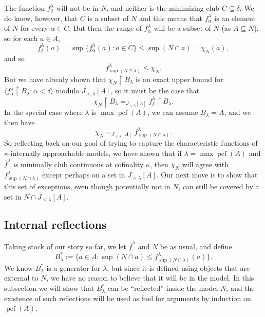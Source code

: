 \documentclass[10pt]{amsart}
\theoremstyle{plain}
\theoremstyle{definition}
\theoremstyle{remark}
\DeclareMathOperator{\pcf}{pcf}
\numberwithin{equation}{section}
\begin{document}
The function $f^\lambda_\delta$ will not be in $N$, and neither is the minimizing club $C\subseteq\delta$.  We do know, however, that $C$ is a
subset of $N$ and this means that $f^\lambda_\alpha$ is an element of $N$ for every $\alpha\in C$. But then the range of $f^\lambda_\alpha$
will be a subset of $N$ (as $A\subseteq N$), so for each $a\in A$,
\begin{equation}
f^\lambda_\delta(a) = \sup\{f^\lambda_\alpha(a):a\in C\}\leq\sup(N\cap a) = \chi_N(a),
\end{equation}
and so
\begin{equation}
\label{eqn:65.8}
f^\lambda_{\sup(N\cap\lambda)}\leq \chi_N.
\end{equation}
But we have already shown that $\chi_N\restriction B_\lambda$ is an exact upper bound for
 $\langle f_\alpha^\lambda\restriction B_\lambda:\alpha<\delta\rangle$ modulo $J_{<\lambda}[A]$, so it must be the case that
 \begin{equation}
 \chi_N\restriction B_\lambda =_{J_{<\lambda}[A]} f^\lambda_\delta\restriction B_\lambda.
 \end{equation}
In the special case where $\lambda$ is $\max\pcf(A)$, we can assume $B_\lambda = A$, and we then have
\begin{equation}
\chi_N =_{J_{<\lambda}[A]}f^\lambda_{\sup(N\cap\lambda)}.
\end{equation}
So reflecting back on our goal of trying to capture the characteristic functions of $\kappa$-internally approachable models, we have
shown that if $\lambda = \max\pcf(A)$ and $\bar{f}^\lambda$ is minimally club continuous at cofinality $\kappa$, then $\chi_N$ will agree
with $f^\lambda_{\sup(N\cap\lambda)}$ except perhaps on a set in $J_{<\lambda}[A]$.   Our next move is to show that this set of exceptions,
even though potentially not in $N$, can still be covered by a set in $N\cap J_{<\lambda}[A]$.


\subsection{Internal reflections}

Taking stock of our story so far, we let $\bar{f}^\lambda$ and $N$ be as usual, and define
\begin{equation}
B^*_\lambda:=\{a\in A:  \sup(N\cap a)\leq f^\lambda_{\sup(N\cap\lambda)}(a)\}.
\end{equation}
We know $B^*_\lambda$ is a generator for $\lambda$, but since it is defined using objects that are external to $N$, we have no reason
to believe that it will be in the model.  In this subsection we will show that $B^*_\lambda$ can be ``reflected'' inside the model $N$, and the
existence of such reflections will be used as fuel for arguments by induction on $\pcf(A)$.
\end{document}
